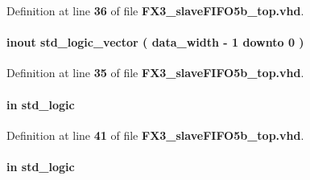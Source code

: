 Definition at line {\bf 36} of file {\bf F\+X3\+\_\+slave\+F\+I\+F\+O5b\+\_\+top.\+vhd}.

\paragraph[{fdata}]{ {\bfseries \textcolor{keywordflow}{inout}\textcolor{vhdlchar}{ }} {\bfseries \textcolor{comment}{std\+\_\+logic\+\_\+vector}\textcolor{vhdlchar}{ }\textcolor{vhdlchar}{(}\textcolor{vhdlchar}{ }\textcolor{vhdlchar}{ }\textcolor{vhdlchar}{ }\textcolor{vhdlchar}{ }{\bfseries {\bf data\+\_\+width}} \textcolor{vhdlchar}{-\/}\textcolor{vhdlchar}{ } \textcolor{vhdldigit}{1} \textcolor{vhdlchar}{ }\textcolor{keywordflow}{downto}\textcolor{vhdlchar}{ }\textcolor{vhdlchar}{ } \textcolor{vhdldigit}{0} \textcolor{vhdlchar}{ }\textcolor{vhdlchar}{)}\textcolor{vhdlchar}{ }} \hspace{0.3cm}{\ttfamily [Port]}}\label{classFX3__slaveFIFO5b__top_a3019e5940b8b703f7d054518c1db9fae}


Definition at line {\bf 35} of file {\bf F\+X3\+\_\+slave\+F\+I\+F\+O5b\+\_\+top.\+vhd}.

\paragraph[{flaga}]{ {\bfseries \textcolor{keywordflow}{in}\textcolor{vhdlchar}{ }} {\bfseries \textcolor{comment}{std\+\_\+logic}\textcolor{vhdlchar}{ }} \hspace{0.3cm}{\ttfamily [Port]}}\label{classFX3__slaveFIFO5b__top_ab49f0833b817d065aebf48ad634e99f6}


Definition at line {\bf 41} of file {\bf F\+X3\+\_\+slave\+F\+I\+F\+O5b\+\_\+top.\+vhd}.

\paragraph[{flagb}]{ {\bfseries \textcolor{keywordflow}{in}\textcolor{vhdlchar}{ }} {\bfseries \textcolor{comment}{std\+\_\+logic}\textcolor{vhdlchar}{ }} \hspace{0.3cm}{\ttfamily [Port]}}\label{classFX3__slaveFIFO5b__top_ab6e57a48da9205bd291e592df0a59f52}



